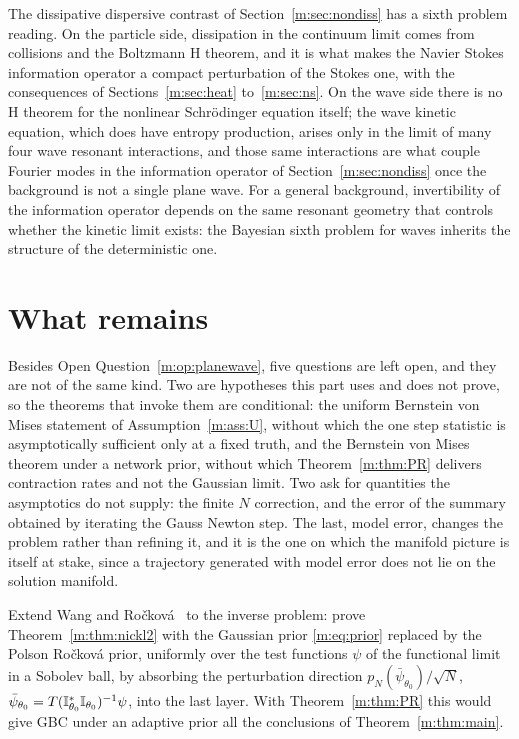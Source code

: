 The dissipative dispersive contrast of Section~\ref{m:sec:nondiss} has a sixth problem reading. On the particle side, dissipation in the continuum limit comes from collisions and the Boltzmann H theorem, and it is what makes the Navier Stokes information operator a compact perturbation of the Stokes one, with the consequences of Sections~\ref{m:sec:heat} to~\ref{m:sec:ns}. On the wave side there is no H theorem for the nonlinear Schr\"odinger equation itself; the wave kinetic equation, which does have entropy production, arises only in the limit of many four wave resonant interactions, and those same interactions are what couple Fourier modes in the information operator of Section~\ref{m:sec:nondiss} once the background is not a single plane wave. For a general background, invertibility of the information operator depends on the same resonant geometry that controls whether the kinetic limit exists: the Bayesian sixth problem for waves inherits the structure of the deterministic one.

\section{What remains}\label{m:sec:open}

Besides Open Question~\ref{m:op:planewave}, five questions are left open, and they are not of the same kind. Two are hypotheses this part uses and does not prove, so the theorems that invoke them are conditional: the uniform Bernstein von Mises statement of Assumption~\ref{m:ass:U}, without which the one step statistic is asymptotically sufficient only at a fixed truth, and the Bernstein von Mises theorem under a network prior, without which Theorem~\ref{m:thm:PR} delivers contraction rates and not the Gaussian limit. Two ask for quantities the asymptotics do not supply: the finite $N$ correction, and the error of the summary obtained by iterating the Gauss Newton step. The last, model error, changes the problem rather than refining it, and it is the one on which the manifold picture is itself at stake, since a trajectory generated with model error does not lie on the solution manifold.

\begin{openquestion}\label{m:op:netprior}%
Extend Wang and Ro\v{c}kov\'a~\cite{wangrockova2020} to the inverse problem: prove Theorem~\ref{m:thm:nickl2} with the Gaussian prior \eqref{m:eq:prior} replaced by the Polson Ro\v{c}kov\'a prior, uniformly over the test functions $\psi$ of the functional limit in a Sobolev ball, by absorbing the perturbation direction $p_N(\bar\psi_{\theta_0})/\sqrt N$, $\bar\psi_{\theta_0}=T(\mathbb{I}^*_{\theta_0}\mathbb{I}_{\theta_0})^{-1}\psi$, into the last layer. With Theorem~\ref{m:thm:PR} this would give GBC under an adaptive prior all the conclusions of Theorem~\ref{m:thm:main}.
\end{openquestion}

